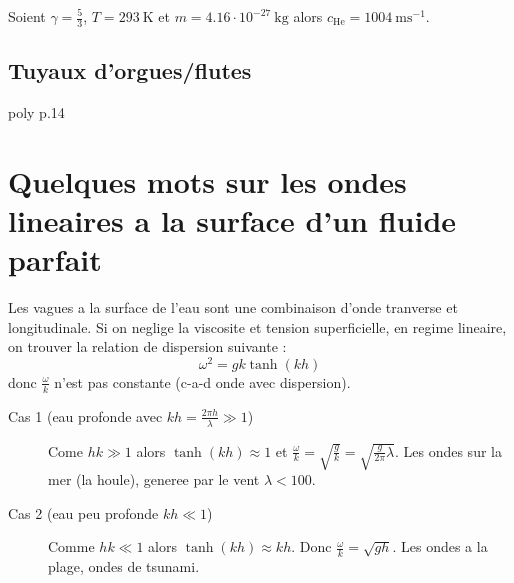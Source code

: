 \begin{example}[Helium]
Soient $\gamma=\frac{5}{3}$, $T=293~\mathrm{K}$ et $m=4.16\cdot 10^{-27}~\mathrm{kg}$ alors $c_{\mathrm{He}}= 1004~\mathrm{ms}^{-1}$.
\end{example}

\subsection{Tuyaux d'orgues/flutes}

poly p.14

\section{Quelques mots sur les ondes lineaires a la surface d'un fluide parfait}

Les vagues a la surface de l'eau sont une combinaison d'onde tranverse et longitudinale. Si on neglige la viscosite et tension superficielle, en regime lineaire, on trouver la relation de dispersion suivante : 
$$
\omega^{2}=gk\tanh(kh)
$$
donc $\frac{\omega}{k}$ n'est pas constante (c-a-d onde avec dispersion).
\begin{description}
\item[Cas 1 (eau profonde avec $kh=\frac{2\pi h}{\lambda} \gg 1$)] Come $hk \gg 1$ alors $\tanh(kh)\approx 1$ et $\frac{\omega}{k}=\sqrt{ \frac{g}{k} }=\sqrt{ \frac{g}{2\pi} \lambda}$. Les ondes sur la mer (la houle), generee par le vent $\lambda<100$.

\item[Cas 2 (eau peu profonde $kh \ll 1$)] Comme $hk\ll 1$ alors $\tanh(kh)\approx kh$. Donc $\frac{\omega}{k}=\sqrt{ gh }$. Les ondes a la plage, ondes de tsunami.
\end{description}